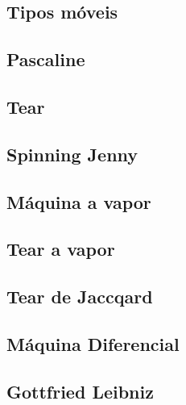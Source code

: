 	\subsection[Tipos móveis]{Tipos móveis}

	
	\subsection[Pascaline]{Pascaline}

	
%
	
	\subsection[Tear]{Tear}

	
\subsection[Spinning Jenny]{Spinning Jenny}

	
	\subsection[Máquina a vapor]{Máquina a vapor}


	\subsection[Tear a vapor]{Tear a vapor}

	
	\subsection[Tear de Jaccqard]{Tear de Jaccqard}

	
	\subsection[Máquina Diferencial]{Máquina Diferencial}


	\subsection[Gottfried Leibniz]{Gottfried Leibniz}

	
